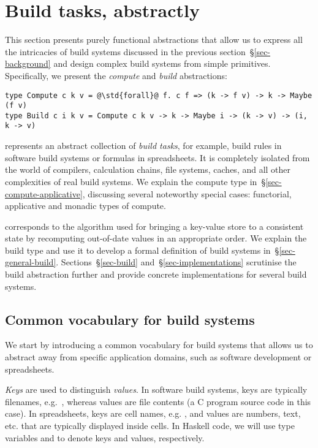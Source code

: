 \section{Build tasks, abstractly}\label{sec-compute}

This section presents purely functional abstractions that allow us to express
all the intricacies of build systems discussed in the previous
section~\S\ref{sec-background} and design complex build systems from simple
primitives. Specifically, we present the \emph{compute} and \emph{build}
abstractions:

\vspace{1mm}
\begin{verbatim}
type Compute c k v = @\std{forall}@ f. c f => (k -> f v) -> k -> Maybe (f v)
type Build c i k v = Compute c k v -> k -> Maybe i -> (k -> v) -> (i, k -> v)
\end{verbatim}
\vspace{1mm}

\noindent
{} represents an abstract collection of \emph{build tasks}, for
example, build rules in software build systems or formulas in spreadsheets. It
is completely isolated from the world of compilers, calculation chains, file
systems, caches, and all other complexities of real build systems. We explain
the compute type in~\S\ref{sec-compute-applicative}, discussing several
noteworthy special cases: functorial, applicative and monadic types of compute.

 corresponds to the algorithm used for bringing a key-value store
\store to a consistent state by recomputing out-of-date values in an
appropriate order. We explain the build type and use it to develop a formal
definition of build systems in~\S\ref{sec-general-build}.
Sections~\S\ref{sec-build} and~\S\ref{sec-implementations} scrutinise the build
abstraction further and provide concrete implementations for several build
systems.

\subsection{Common vocabulary for build systems}
\label{sec-vocabulary}

We start by introducing a common vocabulary for build systems that allows
us to abstract away from specific application domains, such as software
development or spreadsheets.

\emph{Keys} are used to distinguish \emph{values}. In software build systems,
keys are typically filenames, e.g.~, whereas values are file
contents (a C program source code in this case). In spreadsheets, keys are cell
names, e.g. , and values are numbers, text, etc. that are typically
displayed inside cells. In Haskell code, we will use type variables 
and  to denote keys and values, respectively.

